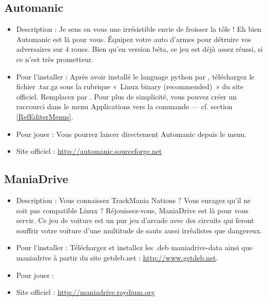 \subsection{Automanic}
\begin{itemize}
\begingroup
{}
\item Description : Je sens en vous une irrésistible envie de froisser la tôle ! Eh bien Automanic est là pour vous. Équipez votre auto d'armes pour détruire vos adversaires sur 4 roues. Bien qu'en version béta, ce jeu est déjà assez réussi, si ce n'est très prometteur.{\par}
\endgroup
\item Pour l'installer : Après avoir installé le language python par , téléchargez le fichier .tar.gz sous la rubrique «~Linux binary (recommended)~» du site officiel. Remplacez  par . Pour plus de simplicité, vous pouvez créer un raccourci dans le menu Applications vers la commande  --- cf. section \ref{RefEditerMenus}.{\par}
\item Pour jouer : Vous pourrez lancer directement Automanic depuis le menu.{\par}
\item Site officiel : \url{http://automanic.sourceforge.net}{\par}
\end{itemize}
\subsection{ManiaDrive}
\begin{itemize}
\begingroup
{}
\item Description : Vous connaissez TrackMania Nations ? Vous enragez qu'il ne soit pas compatible Linux ? Réjouissez-vous, ManiaDrive est là pour vous servir. Ce jeu de voiture est un pur jeu d'arcade avec des circuits qui feront souffrir votre voiture d'une multitude de sauts aussi irréalistes que dangereux.{\par}
\endgroup
\item Pour l'installer : Téléchargez et installez les .deb maniadrive-data ainsi que maniadrive à partir du site getdeb.net :
\url{http://www.getdeb.net}.{\par}
\item Pour jouer : 
\item Site officiel : \url{http://maniadrive.raydium.org}{\par}
\end{itemize}

